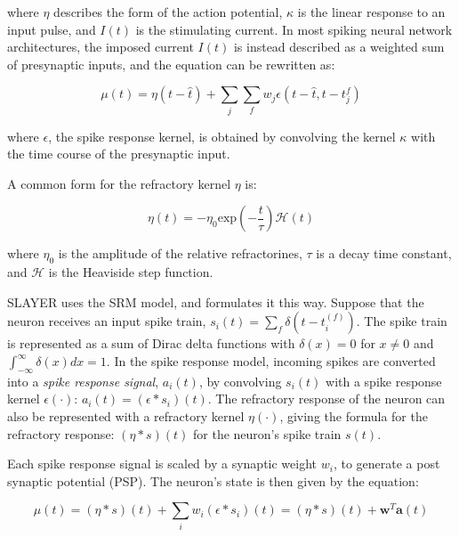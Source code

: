 \documentclass[fyp]{socreport}
\begin{document}
where $\eta$ describes the form of the action potential, $\kappa$ is the linear
response to an input pulse, and $I(t)$ is the stimulating current. In most
spiking neural network architectures, the imposed current $I(t)$ is instead
described as a weighted sum of presynaptic inputs, and the equation can be
rewritten as:

\begin{equation}
  \label{eq:srm}
  \mu(t) = \eta(t - \hat{t}) + \sum_{j} \sum_{f} w_{j}\epsilon(t - \hat{t}, t-t_{j}^{f})
\end{equation}


where $\epsilon$, the spike response kernel, is obtained by convolving the
kernel $\kappa$ with the time course of the presynaptic input.

A common form for the refractory kernel $\eta$ is:

\begin{equation}
  \label{eq:srm_eta}
  \eta(t) = - \eta_{0} \textrm{exp} \left(- \frac{t}{\tau}\right) \mathcal{H}(t)
\end{equation}

where $\eta_{0}$ is the amplitude of the relative refractorines, $\tau$ is a
decay time constant, and $\mathcal{H}$ is the Heaviside step function.

SLAYER uses the SRM model, and formulates it this way. Suppose that the neuron
receives an input spike train,
$s_i(t) = \sum_{f} \delta\left( t - t_i^{(f)} \right)$. The spike train is
represented as a sum of Dirac delta functions with \(\delta(x) = 0\) for
\(x \ne 0\) and \(\int_{-\infty}^{\infty} \delta(x)dx = 1\). In the spike
response model, incoming spikes are converted into a \emph{spike response
  signal}, $a_{i}(t)$, by convolving $s_{i}(t)$ with a spike response kernel
$\epsilon(\cdot)$: $a_{i}(t) = (\epsilon \ast s_{i})(t)$. The refractory
response of the neuron can also be represented with a refractory kernel
$\eta(\cdot)$, giving the formula for the refractory response:
$(\eta \ast s)(t)$ for the neuron's spike train $s(t)$.

Each spike response signal is scaled by a synaptic weight $w_{i}$, to generate a
post synaptic potential (PSP). The neuron's state is then given by the equation:

\begin{equation}
  \label{eq:slayer_srm}
  \mu(t) = (\eta \ast s)(t) + \sum_{i} w_{i}(\epsilon \ast s_{i})(t) = (\eta \ast s)(t) + \boldsymbol{w}^{T} \boldsymbol{a}(t)
\end{equation}
\end{document}
